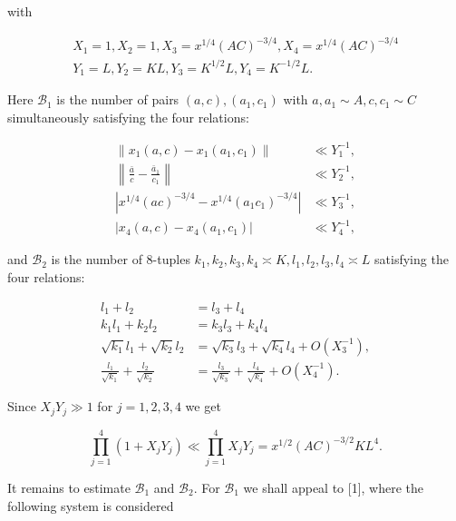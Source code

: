 \documentclass[10pt]{article}
\begin{document}
with

$$
\begin{gathered}
X_{1}=1, X_{2}=1, X_{3}=x^{1 / 4}(A C)^{-3 / 4}, X_{4}=x^{1 / 4}(A C)^{-3 / 4} \\
Y_{1}=L, Y_{2}=K L, Y_{3}=K^{1 / 2} L, Y_{4}=K^{-1 / 2} L .
\end{gathered}
$$

Here $\mathscr{B}_{1}$ is the number of pairs $(a, c),\left(a_{1}, c_{1}\right)$ with $a, a_{1} \sim A, c, c_{1} \sim C$ simultaneously satisfying the four relations:


\begin{align*}
\left\|x_{1}(a, c)-x_{1}\left(a_{1}, c_{1}\right)\right\| & \ll Y_{1}^{-1},  \tag{13.1}\\
\left\|\frac{\bar a}{c}-\frac{\bar a_{1}}{c_{1}}\right\| & \ll Y_{2}^{-1},  \tag{13.2}\\
\left|x^{1 / 4}(a c)^{-3 / 4}-x^{1 / 4}\left(a_{1} c_{1}\right)^{-3 / 4}\right| & \ll Y_{3}^{-1},  \tag{13.3}\\
\left|x_{4}(a, c)-x_{4}\left(a_{1}, c_{1}\right)\right| & \ll Y_{4}^{-1}, \tag{13.4}
\end{align*}


and $\mathscr{B}_{2}$ is the number of 8-tuples $k_{1}, k_{2}, k_{3}, k_{4} \asymp K, l_{1}, l_{2}, l_{3}, l_{4} \asymp L$ satisfying the four relations:


\begin{align*}
l_{1}+l_{2} & =l_{3}+l_{4}  \tag{13.5}\\
k_{1} l_{1}+k_{2} l_{2} & =k_{3} l_{3}+k_{4} l_{4}  \tag{13.6}\\
\sqrt{k_{1}} l_{1}+\sqrt{k_{2}} l_{2} & =\sqrt{k_{3}} l_{3}+\sqrt{k_{4}} l_{4}+O\left(X_{3}^{-1}\right),  \tag{13.7}\\
\frac{l_{1}}{\sqrt{k_{1}}}+\frac{l_{2}}{\sqrt{k_{2}}} & =\frac{l_{3}}{\sqrt{k_{3}}}+\frac{l_{4}}{\sqrt{k_{4}}}+O\left(X_{4}^{-1}\right) . \tag{13.8}
\end{align*}


Since $X_{j} Y_{j} \gg 1$ for $j=1,2,3,4$ we get


\begin{equation*}
\prod_{j=1}^{4}\left(1+X_{j} Y_{j}\right) \ll \prod_{j=1}^{4} X_{j} Y_{j}=x^{1 / 2}(A C)^{-3 / 2} K L^{4} . \tag{13.9}
\end{equation*}


It remains to estimate $\mathscr{B}_{1}$ and $\mathscr{B}_{2}$. For $\mathscr{B}_{1}$ we shall appeal to [1], where the following system is considered
\end{document}
